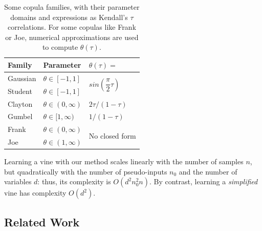\documentclass{article}
\begin{document}
\begin{table}
  \caption{Some copula families, with their parameter domains and
  expressions as Kendall's $\tau$ correlations. For some copulas like Frank or
  Joe, numerical approximations are used to compute $\theta(\tau)$.}
  \begin{center}
  \begin{tabular}{|l|l|l|}
  \hline
  \textbf{Family} & \textbf{Parameter} & $\theta(\tau) = $ \\ \hline
  Gaussian               & $\theta \in [-1,1]$       & \multirow{2}{*}{$sin\left(\dfrac{\pi}{2} \tau\right)$} \\\cline{1-2}
  Student                & $\theta \in [-1,1]$       & \\ \hline
  Clayton                & $\theta \in (0, \infty) $ & $2\tau/(1-\tau)$ \\ \hline
  Gumbel                 & $\theta \in [1,\infty)$   & $1/(1-\tau)$ \\ \hline
  Frank                  & $\theta \in (0, \infty)$  & \multirow{2}{*}{No closed form} \\\cline{1-2}
  Joe                    & $\theta \in (1, \infty)$  & \\ \hline
  \end{tabular}
  \end{center}
  \label{table:thetatau}
\end{table}

Learning a vine with our method scales linearly with the number of samples $n$,
but quadratically with the number of pseudo-inputs $n_0$ and the number of variables
$d$: thus, its complexity is $O(d^2n_0^2n)$. By contrast,
learning a \emph{simplified} vine has complexity $O(d^2)$.

\subsection{Related Work}\label{sec:mll}
\end{document}
